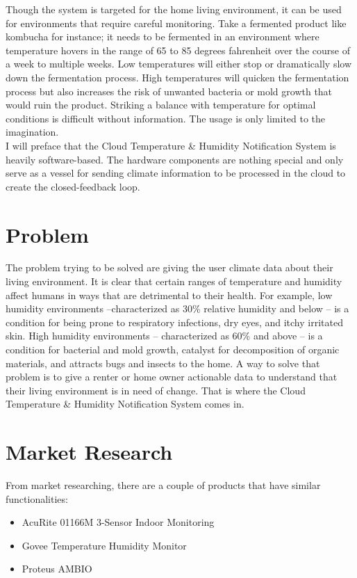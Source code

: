 \documentclass{article}
\begin{document}
Though the system is targeted for the home living environment, it can be used for environments that require careful monitoring. Take a fermented product like kombucha for instance; it needs to be fermented in an environment where temperature hovers in the range of 65 to 85 degrees fahrenheit over the course of a week to multiple weeks. Low temperatures will either stop or dramatically slow down the fermentation process. High temperatures will quicken the fermentation process but also increases the risk of unwanted bacteria or mold growth that would ruin the product. Striking a balance with temperature for optimal conditions is difficult without information. The usage is only limited to the imagination.\\

I will preface that the Cloud Temperature \& Humidity Notification System is heavily software-based. The hardware components are nothing special and only serve as a vessel for sending climate information to be processed in the cloud to create the closed-feedback loop.

\section{Problem}
The problem trying to be solved are giving the user climate data about their living environment. It is clear that certain ranges of temperature and humidity affect humans in ways that are detrimental to their health. For example, low humidity environments --characterized as 30\% relative humidity and below -- is a condition for being prone to respiratory infections, dry eyes, and itchy irritated skin. High humidity environments -- characterized as 60\% and above -- is a condition for bacterial and mold growth, catalyst for decomposition of organic materials, and attracts bugs and insects to the home. A way to solve that problem is to give a renter or home owner actionable data to understand that their living environment is in need of change. That is where the Cloud Temperature \& Humidity Notification System comes in.

\section{Market Research}
From market researching, there are a couple of products that have similar functionalities:

\begin{itemize}
	\setlength{\itemindent}{2em}

	\item AcuRite 01166M 3-Sensor Indoor Monitoring
	\item Govee Temperature Humidity Monitor
	\item Proteus AMBIO
\end{itemize}
\end{document}
